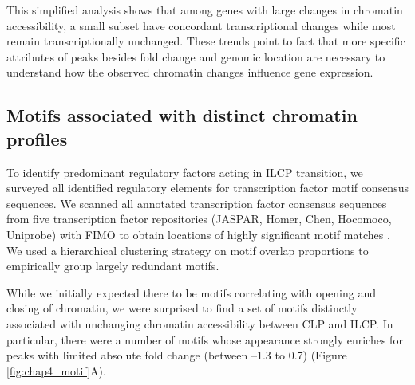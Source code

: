 This simplified analysis shows that among genes with large changes in chromatin accessibility, a small subset have concordant transcriptional changes while most remain transcriptionally unchanged. These trends point to fact that more specific attributes of peaks besides fold change and genomic location are necessary to understand how the observed chromatin changes influence gene expression.


\subsection{Motifs associated with distinct chromatin profiles}

To identify predominant regulatory factors acting in ILCP transition, we surveyed all identified regulatory elements for transcription factor motif consensus sequences. We scanned all annotated transcription factor consensus sequences from five transcription factor repositories (JASPAR, Homer, Chen, Hocomoco, Uniprobe) with FIMO to obtain locations of highly significant motif matches \cite{grant2011}. We used a hierarchical clustering strategy on motif overlap proportions to empirically group largely redundant motifs. 

While we initially expected there to be motifs correlating with opening and closing of chromatin, we were surprised to find a set of motifs distinctly associated with unchanging chromatin accessibility between CLP and ILCP. In particular, there were a number of motifs whose appearance strongly enriches for peaks with limited absolute fold change (between –1.3 to 0.7) (Figure \ref{fig:chap4_motif}A). 

